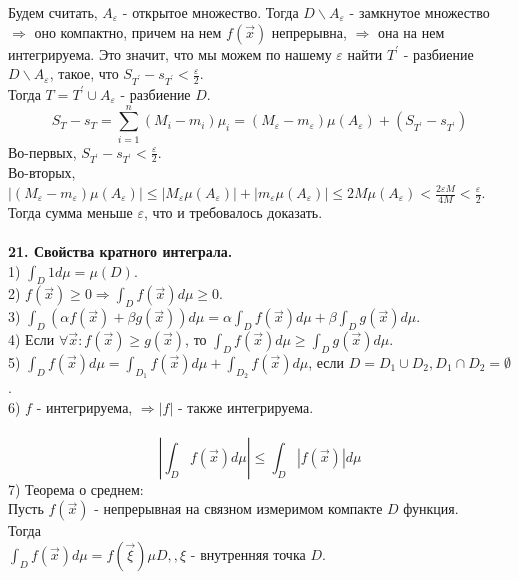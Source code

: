 \documentclass[12pt]{article}
\begin{document}
Будем считать, $A_\varepsilon$ - открытое множество. Тогда $D \backslash A_\varepsilon$ - замкнутое множество $\Rightarrow$ оно компактно, причем на нем $f(\overrightarrow{x})$ непрерывна, $\Rightarrow$ она на нем интегрируема. Это значит, что мы можем по нашему $\varepsilon$ найти $T^{'}$ - разбиение $D \backslash A_\varepsilon$, такое, что $S_{T^{'}}-s_{T^{'}} < \frac{\varepsilon}{2}$.\\
Тогда $T = T^{'} \cup A_\varepsilon$ - разбиение $D$.\\
$$S_T - s_T = \sum_{i=1}^n (M_i - m_i) \mu_i = (M_\varepsilon - m_\varepsilon) \mu(A_\varepsilon) + (S_{T^{'}}-s_{T^{'}})$$
Во-первых, $S_{T^{'}}-s_{T^{'}} < \frac{\varepsilon}{2}$.\\
Во-вторых, $|(M_\varepsilon - m_\varepsilon) \mu(A_\varepsilon)| \leq |M_\varepsilon \mu(A_\varepsilon)| + |m_\varepsilon \mu(A_\varepsilon)| \leq 2M\mu(A_\varepsilon) < \frac{2\varepsilon M}{4M}<\frac{\varepsilon}{2}$.\\
Тогда сумма меньше $\varepsilon$, что и требовалось доказать.\\
\\
\label{question21}\textbf{21. Свойства кратного интеграла.}\\
1) $\int_D 1d\mu = \mu(D)$.\\
2) $f(\overrightarrow{x}) \geq 0 \Rightarrow \int_D f(\overrightarrow{x})d\mu \geq 0$.\\
3) $\int_D(\alpha f(\overrightarrow{x})+\beta g(\overrightarrow{x}))d\mu = \alpha\int_D f(\overrightarrow{x})d\mu + \beta\int_D g(\overrightarrow{x})d\mu$.\\
4) Если $\forall \overrightarrow{x} : f(\overrightarrow{x}) \geq g(\overrightarrow{x})$, то $\int_D f(\overrightarrow{x})d\mu \geq \int_D g(\overrightarrow{x})d\mu$.\\
5) $\int_D f(\overrightarrow{x})d\mu = \int_{D_1} f(\overrightarrow{x})d\mu + \int_{D_2} f(\overrightarrow{x})d\mu$, если $D = D_1 \cup D_2, D_1 \cap D_2 = \emptyset$.\\
6) $f$ - интегрируема, $\Rightarrow |f|$ - также интегрируема.\\
\\
$$|\int_D f(\overrightarrow{x})d\mu| \leq \int_D |f(\overrightarrow{x})|d\mu$$
7) Теорема о среднем:\\
Пусть $f(\overrightarrow{x})$ - непрерывная на связном измеримом компакте $D$ функция.\\
Тогда\\
$\int_D f(\overrightarrow{x}) d\mu = f(\overrightarrow{\xi})\mu D, , \xi$ - внутренняя точка $D$.\\
\end{document}
